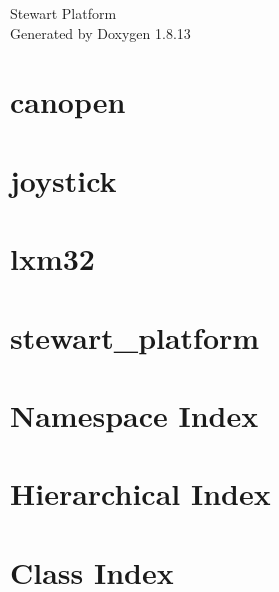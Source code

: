 \documentclass[twoside]{book}
\newcommand{\+}{\discretionary{\mbox{\scriptsize$\hookleftarrow$}}{}{}}
\newcommand{\clearemptydoublepage}{%
  \newpage{\pagestyle{empty}\cleardoublepage}%
}
\begin{document}
\hypersetup{pageanchor=false,
             bookmarksnumbered=true,
             pdfencoding=unicode
            }
\begin{titlepage}
\vspace*{7cm}
\begin{center}%
{\Large Stewart Platform }\\
\vspace*{1cm}
{\large Generated by Doxygen 1.8.13}\\
\end{center}
\end{titlepage}
\clearemptydoublepage
{}
\tableofcontents
\clearemptydoublepage
{}
\hypersetup{pageanchor=true}

\chapter{canopen}
\label{md_lib_lxm32_lib_canopen__r_e_a_d_m_e}

\chapter{joystick}
\label{md_lib_lxm32_lib_joystick__r_e_a_d_m_e}

\chapter{lxm32}
\label{md_lib_lxm32__r_e_a_d_m_e}

\chapter{stewart\+\_\+platform}
\label{md__r_e_a_d_m_e}

\chapter{Namespace Index}

\chapter{Hierarchical Index}

\chapter{Class Index}

\end{document}
